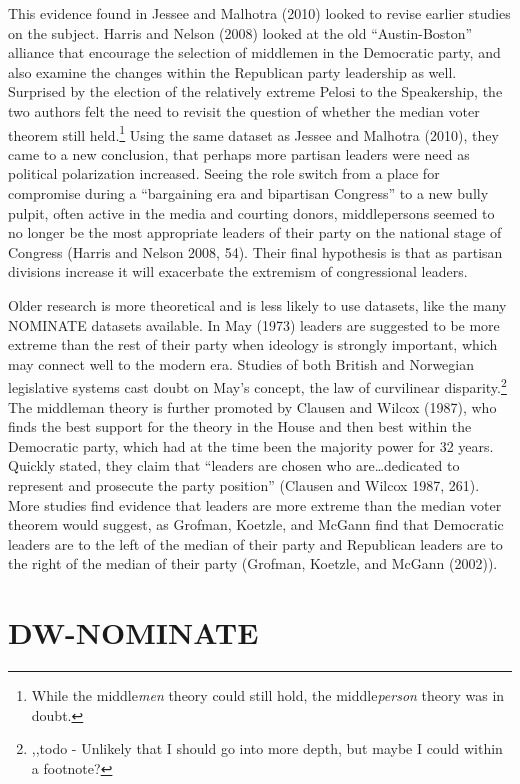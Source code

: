 \documentclass[12pt,twoside]{reedthesis}
\begin{document}
  This evidence found in Jessee and Malhotra (2010) looked to revise
  earlier studies on the subject. Harris and Nelson (2008) looked at the
  old ``Austin-Boston'' alliance that encourage the selection of middlemen
  in the Democratic party, and also examine the changes within the
  Republican party leadership as well. Surprised by the election of the
  relatively extreme Pelosi to the Speakership, the two authors felt the
  need to revisit the question of whether the median voter theorem still
  held.\footnote{While the middle\emph{men} theory could still hold, the
    middle\emph{person} theory was in doubt.} Using the same dataset as
  Jessee and Malhotra (2010), they came to a new conclusion, that perhaps
  more partisan leaders were need as political polarization increased.
  Seeing the role switch from a place for compromise during a ``bargaining
  era and bipartisan Congress'' to a new bully pulpit, often active in the
  media and courting donors, middlepersons seemed to no longer be the most
  appropriate leaders of their party on the national stage of Congress
  (Harris and Nelson 2008, 54). Their final hypothesis is that as partisan
  divisions increase it will exacerbate the extremism of congressional
  leaders.
  
  Older research is more theoretical and is less likely to use datasets,
  like the many NOMINATE datasets available. In May (1973) leaders are
  suggested to be more extreme than the rest of their party when ideology
  is strongly important, which may connect well to the modern era. Studies
  of both British and Norwegian legislative systems cast doubt on May's
  concept, the law of curvilinear disparity.\footnote{,,todo - Unlikely
    that I should go into more depth, but maybe I could within a footnote?}
  The middleman theory is further promoted by Clausen and Wilcox (1987),
  who finds the best support for the theory in the House and then best
  within the Democratic party, which had at the time been the majority
  power for 32 years. Quickly stated, they claim that ``leaders are chosen
  who are\ldots{}dedicated to represent and prosecute the party position''
  (Clausen and Wilcox 1987, 261). More studies find evidence that leaders
  are more extreme than the median voter theorem would suggest, as
  Grofman, Koetzle, and McGann find that Democratic leaders are to the
  left of the median of their party and Republican leaders are to the
  right of the median of their party (Grofman, Koetzle, and McGann
  (2002)).
  
  \section{DW-NOMINATE}\label{dw-nominate}
  
\end{document}
